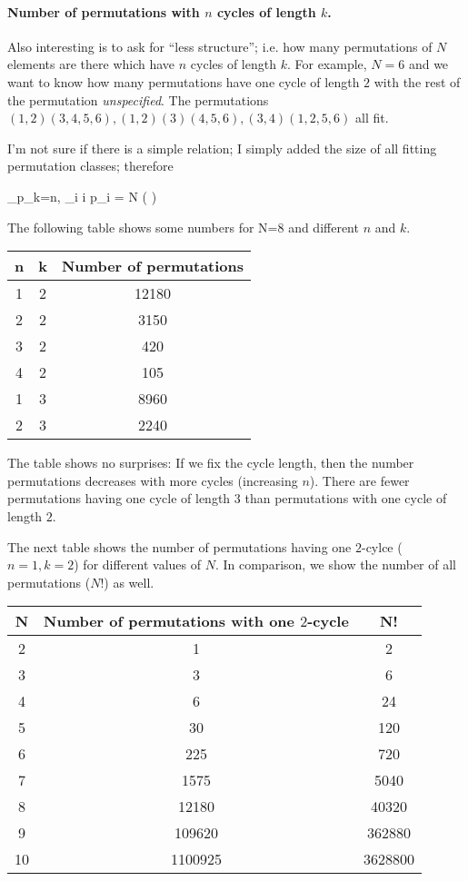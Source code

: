 \paragraph{Number of permutations with $n$ cycles of length $k$.} Also interesting is to ask for ``less structure''; i.e. how many permutations of $N$ elements are there which have $n$ cycles of length $k$. For example, $N=6$ and we want to know how many permutations have one cycle of length $2$ with the rest of the permutation \emph{unspecified}. The permutations $(1,2)(3,4,5,6), (1,2)(3)(4,5,6), (3,4)(1,2,5,6)$ all fit.

I'm not sure if there is a simple relation; I simply added the size of all fitting permutation classes; therefore

\bee
\sum_{p_k=n, \sum_i i p_i = N } \left(  \right)
\eee

The following table shows some numbers for N=8 and different $n$ and $k$.

\vspace{2mm}

\begin{tabular}{ccc}
  n  & k & Number of permutations \\ \hline
  1  & 2 & 12180 \\
  2  & 2 & 3150 \\
  3  &2 & 420 \\
  4  &2 & 105 \\ \hline
  1  &3 & 8960 \\
  2  &3 & 2240 \\
\end{tabular}

\vspace{2mm}

The table shows no surprises: If we fix the cycle length, then the number permutations decreases with more cycles (increasing $n$). There are fewer permutations having one cycle of length $3$ than permutations with one cycle of length $2$.

The next table shows the number of permutations having one $2$-cylce ($n=1, k=2$) for different values of $N$. In comparison, we show the number of all permutations ($N!$) as well. 

\vspace{2mm}

\begin{tabular}{ccc}
  N & Number of permutations with one $2$-cycle & N! \\ \hline
  2 & 1 & 2 \\
  3 & 3 & 6 \\
  4 & 6 & 24 \\
  5 & 30 & 120 \\
  6 & 225 & 720 \\
  7 & 1575 & 5040 \\
  8 & 12180 & 40320 \\
  9 & 109620 & 362880 \\
  10 & 1100925 & 3628800 
\end{tabular}

